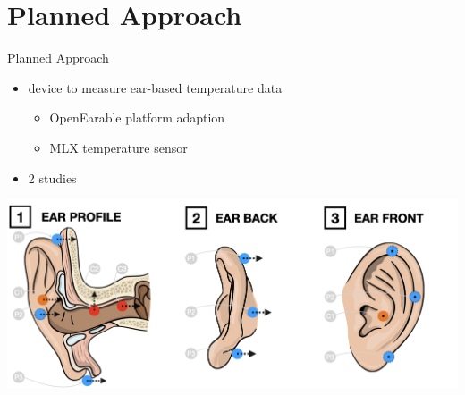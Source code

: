 \documentclass[en]{sdqbeamer}
\begin{document}

\section{Planned Approach}
\begin{frame}{Planned Approach}
    \begin{itemize}
        \item device to measure ear-based temperature data
        \begin{itemize}
            \item OpenEarable platform adaption
            \item MLX temperature sensor
        \end{itemize}
        \item 2 studies
    \end{itemize}
    \begin{center}
        \includegraphics[scale=0.17]{../thesis-doc/images/ear_measurement_points/emp.png}    
    \end{center}
\end{frame}
\end{document}
